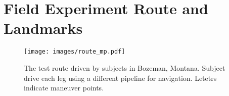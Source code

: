 \chapter{Field Experiment Route and Landmarks}\label{appendix:route}

\begin{figure}[htbp]
  \centering
  \texttt{[image: images/route\_mp.pdf]}
  \caption{The test route driven by subjects in Bozeman, Montana. Subject drive each leg using a different pipeline for navigation. Letetrs indicate maneuver points.}
  \label{fig:routeWithMPs}
\end{figure}